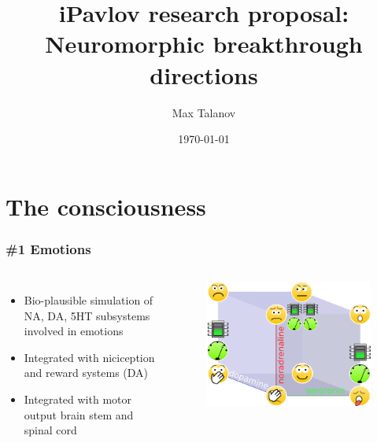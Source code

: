\documentclass[12pt, aspectratio=169]{beamer}
\title[HSE research proposal]{iPavlov research proposal: \\Neuromorphic breakthrough directions} %
\author[Max Talanov]{
  Max Talanov
}
\institute[for: HSE] %
{
for HSE \\ %
\medskip
\textit{max.talanov@gmail.com} %
}
\date{\today} %
\begin{document}
\begin{frame}
\titlepage %
\end{frame}



\section{The consciousness} %

\begin{frame}
\frametitle{\#1 Emotions}
\begin{columns}[c] %


\begin{itemize}
\item Bio-plausible simulation of NA, DA, 5HT subsystems involved in emotions
\item Integrated with niciception and reward systems (DA)
\item Integrated with motor output brain stem and spinal cord
\end{itemize}

\begin{figure}
\includegraphics[width=0.8\linewidth]{cube_of_emotional_parameters_machine}
\end{figure}
\end{columns}
\end{frame}
\end{document}
